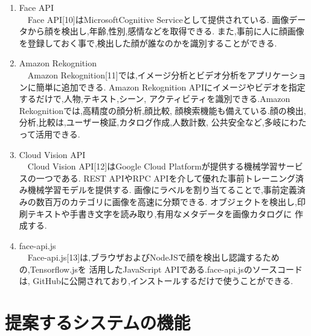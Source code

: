 \clearpage
\renewcommand{\labelenumi}{(\arabic{enumi})}

\begin{enumerate}
  \item Face API \\
  　Face API[10]はMicrosoftCognitive Serviceとして提供されている.
  画像データから顔を検出し,年齢,性別,感情などを取得できる.
  また,事前に人に顔画像を登録しておく事で,検出した顔が誰なのかを識別することができる.\\

  \item Amazon Rekognition \\
  　Amazon Rekognition[11]では,イメージ分析とビデオ分析をアプリケーションに簡単に追加できる.
  Amazon Rekognition APIにイメージやビデオを指定するだけで,人物,テキスト,シーン,
  アクティビティを識別できる.Amazon Rekognitionでは,高精度の顔分析,顔比較,
  顔検索機能も備えている.顔の検出,分析,比較は,ユーザー検証,カタログ作成,人数計数,
  公共安全など,多岐にわたって活用できる.\\

  \item Cloud Vision API  \\
  　Cloud Vision API[12]はGoogle Cloud Platformが提供する機械学習サービスの一つである.
  REST APIやRPC APIを介して優れた事前トレーニング済み機械学習モデルを提供する.
  画像にラベルを割り当てることで,事前定義済みの数百万のカテゴリに画像を高速に分類できる.
  オブジェクトを検出し,印刷テキストや手書き文字を読み取り,有用なメタデータを画像カタログに
  作成する.\\

  \item face-api.js \\
  　Face-api.js[13]は,ブラウザおよびNodeJSで顔を検出し認識するための,Tensorflow.jsを
  活用したJavaScript APIである.face-api.jsのソースコードは,
  GitHubに公開されており,インストールするだけで使うことができる.
  
\end{enumerate}


\section{提案するシステムの機能}
\label{sec:chart_admin}

\renewcommand{\labelenumi}{(\arabic{enumi})}

